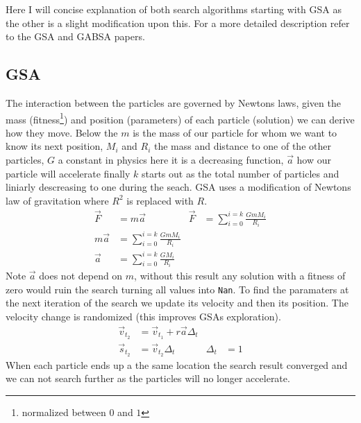 Here I will concise explanation of both search algorithms starting with GSA as the other is a slight modification upon this. For a more detailed description refer to the GSA\cite{GSA} and GABSA\cite{GABSA} papers.
%
\subsection{GSA} \label{sec:GSA}
The interaction between the particles are governed by Newtons laws, given the mass (fitness\footnote{normalized between $0$ and $1$}) and position (parameters) of each particle (solution) we can derive how they move. Below the $m$ is the mass of our particle for whom we want to know its next position, $M_i$ and $R_i$ the mass and distance to one of the other particles, $G$ a constant in physics here it is a decreasing function, $\vec{a}$ how our particle will accelerate finally $k$ starts out as the total number of particles and liniarly descreasing to one during the seach.
GSA uses a modification of Newtons law of gravitation where $R^2$ is replaced with $R$.
%
\begin{subequations}
\begin{align}
	\vec{F}&=m\vec{a} &            \vec{F}&=\sum_{i=0}^{i=k} \frac{GmM_i}{R_i} \\
	m\vec{a} &= \sum_{i=0}^{i=k} \frac{GmM_i}{R_i} \\
	\vec{a} &= \sum_{i=0}^{i=k} \frac{GM_i}{R_i}
\end{align}
\end{subequations}
%
Note $\vec{a}$ does not depend on $m$, without this result any solution with a fitness of zero would ruin the search turning all values into \texttt{Nan}. To find the paramaters at the next iteration of the search we update its velocity and then its position. The velocity change is randomized (this improves GSAs exploration).
%
\begin{subequations}
\begin{align} \label{eq:paramater_update}
	\vec{v}_{t_2} &= \vec{v}_{t_1} + r \vec{a}\Delta_t \\
	\vec{s}_{t_2} &= \vec{v}_{t_2}\Delta_t & \Delta_t &= 1 \label{eq:pos_update}
\end{align}
\end{subequations}
%
When each particle ends up a the same location the search result converged and we can not search further as the particles will no longer accelerate.
%
